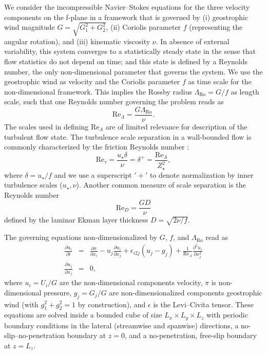 \documentclass[smallcondensed,final]{svjour3}
\newcommand{\p}{\partial}
\newcommand{\RO}{\mathrm{Ro}}
\newcommand{\RE}{\mathrm{Re}}
\newcommand{\LR}{\Lambda_\RO}
\begin{document}
%
\par
%
We consider the incompressible Navier--Stokes equations for the three velocity components on the f-plane in a framework
that is governed by %
(i)   geostrophic wind magnitude $G=\sqrt{G_1^2+G_2^2}$,
(ii)  Coriolis parameter $f$ (representing the angular rotation), and
(iii) kinematic viscosity $\nu$.
%
In absence of external variability, this system converges to a statistically steady state in the sense that flow
statistics do not depend on time; and this state is defined by a Reynolds number,
the only non-dimensional parameter that governs the system.
%
We use the geostrophic wind as velocity and the Coriolis parameter $f$ as time scale for the non-dimensional
framework.
%
This implies the Rossby radius $\LR=G/f$ as length scale, such that one Reynolds number
governing the problem reads as
%
\begin{equation}
  \RE_\Lambda=\frac{G \LR }{\nu}. 
\end{equation}
%
The scales used in defining $\RE_\Lambda$ are of limited relevance for description of the turbulent flow state.
%
The turbulence scale separation in a wall-bounded flow is commonly characterized by the friction Reynolds number
\citep{jimenez:ARF2012}:
\begin{equation}
  \RE_\tau = \frac{u_\star\delta}{\nu} = \delta^+ = \frac{\RE_\Lambda}{Z_\star^2}, 
\end{equation}
where $\delta=u_\star/f$ and we use a superscript $'+'$ to denote normalization by inner turbulence
scales ($u_\star, \nu$).
%
Another common measure of scale separation is the Reynolds number 
\begin{equation}
  \RE_D = \frac{G D}{\nu} 
\end{equation}  defined by the laminar Ekman layer thickness $D=\sqrt{2\nu/f}$.
%
\par
%
The governing equations  non-dimensionalized by $G$, $f$, and $\Lambda_\mathrm{\RO}$ read as 
\begin{subequations} 
\label{eqn:governing} 
\begin{eqnarray}
  \frac{\partial u_i}{\partial t} &=& \frac{\p \pi}{\p x_i} - u_j \frac{\p u_i}{\p x_j} + \epsilon_{i2j} (u_j -g_j)   + \frac{1}{\RE_\Lambda} \frac{\p^2 u_i}{\p x_{j}^2} \\ 
  \frac{\partial u_j}{\partial x_j} &=& 0,   
\end{eqnarray} 
\end{subequations}
where $u_i=U_i/G$ are the non-dimensional components velocity, $\pi$ is non-dimen\-sio\-nal pressure, $g_j=G_j/G$ are non-dimensionalized components geostrophic wind (with $g_{1}^2+g_{2}^2=1$ by construction), and $\epsilon$ is the Levi--Civita tensor.
%
These equations are solved inside a bounded cube of size $L_x \times L_y \times L_z$ with periodic boundary conditions in the lateral (streamwise and spanwise) directions, a no-slip--no-penetration boundary at $z=0$, and
a no-penetration, free-slip boundary at $z=L_z$.
%
\end{document}
